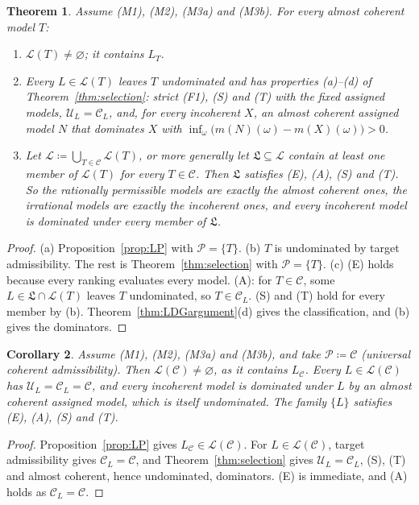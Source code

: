 \documentclass[11pt]{article}
\newtheorem{theorem}{Theorem}[section]
\newtheorem{corollary}[theorem]{Corollary}
\theoremstyle{definition}
\newcommand{\C}{\mathcal C}
\newcommand{\U}{\mathcal U}
\newcommand{\Lf}{\mathfrak L}
\newcommand{\Lc}{\mathcal L}
\newcommand{\Pc}{\mathcal P}
\begin{document}
\begin{theorem}\label{thm:main}
Assume (M1), (M2), (M3a) and (M3b). For every almost coherent model $T$:
\begin{enumerate}[label=(\alph*)]
\item $\Lc(T)\ne\varnothing$; it contains $L_T$.
\item Every $L\in\Lc(T)$ leaves $T$ undominated and has properties (a)--(d) of Theorem~\ref{thm:selection}: strict (F1), (S) and (T) with the fixed assigned models, $\U_L=\C_L$, and, for every incoherent $X$, an almost coherent assigned model $N$ that dominates $X$ with $\inf_{\omega}\bigl(m(N)(\omega)-m(X)(\omega)\bigr)>0$.
\item Let $\Lc\coloneqq\bigcup_{T\in\C}\Lc(T)$, or more generally let $\Lf\subseteq\Lc$ contain at least one member of $\Lc(T)$ for every $T\in\C$. Then $\Lf$ satisfies (E), (A), (S) and (T). So the rationally permissible models are exactly the almost coherent ones, the irrational models are exactly the incoherent ones, and every incoherent model is dominated under every member of $\Lf$.
\end{enumerate}
\end{theorem}
\begin{proof}
(a) Proposition~\ref{prop:LP} with $\Pc=\{T\}$.
(b) $T$ is undominated by target admissibility. The rest is Theorem~\ref{thm:selection} with $\Pc=\{T\}$.
(c) (E) holds because every ranking evaluates every model. (A): for $T\in\C$, some $L\in\Lf\cap\Lc(T)$ leaves $T$ undominated, so $T\in\C_L$. (S) and (T) hold for every member by (b). Theorem~\ref{thm:LDGargument}(d) gives the classification, and (b) gives the dominators.
\end{proof}

\begin{corollary}\label{cor:universal}
Assume (M1), (M2), (M3a) and (M3b), and take $\Pc\coloneqq\C$ (universal coherent admissibility). Then $\Lc(\C)\ne\varnothing$, as it contains $L_\C$. Every $L\in\Lc(\C)$ has $\U_L=\C_L=\C$, and every incoherent model is dominated under $L$ by an almost coherent assigned model, which is itself undominated. The family $\{L\}$ satisfies (E), (A), (S) and (T).
\end{corollary}
\begin{proof}
Proposition~\ref{prop:LP} gives $L_\C\in\Lc(\C)$. For $L\in\Lc(\C)$, target admissibility gives $\C_L=\C$, and Theorem~\ref{thm:selection} gives $\U_L=\C_L$, (S), (T) and almost coherent, hence undominated, dominators. (E) is immediate, and (A) holds as $\C_L=\C$.
\end{proof}
\endgroup
\end{document}
